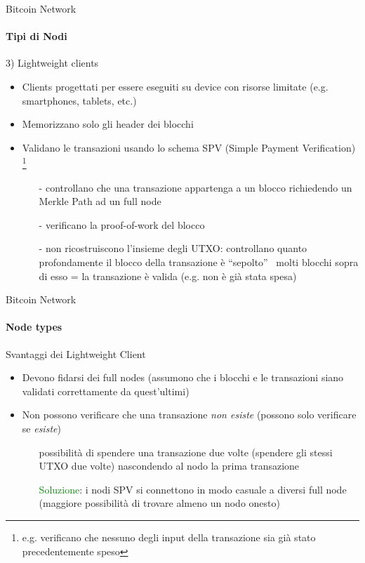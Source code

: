 \documentclass{beamer}
\begin{document}
  
  
  
  \begin{frame}{Bitcoin Network}
    \framesubtitle{Tipi di Nodi}
    \begin{block}{3) Lightweight clients}
        \begin{itemize}
            \item Clients progettati per essere eseguiti su device con risorse limitate (e.g. smartphones, tablets, etc.) 
            \item Memorizzano solo gli header dei blocchi 
            \item Validano le transazioni usando lo schema SPV (Simple Payment Verification) \footnote{e.g. verificano che nessuno degli input della transazione sia già stato precedentemente speso}
            \begin{itemize}
                \item[-] controllano che una transazione appartenga a un blocco richiedendo un Merkle Path ad un full node
                \item[-] verificano la proof-of-work del blocco
                \item[-] non ricostruiscono l'insieme degli UTXO: controllano quanto profondamente il blocco della transazione è ``sepolto'' \MVRightarrow\, molti blocchi sopra di esso = la transazione è valida (e.g. non è già stata spesa)
            \end{itemize}
        \end{itemize}
    \end{block}
  \end{frame}
  
  
  
  
  \begin{frame}{Bitcoin Network}
    \framesubtitle{Node types}
    \begin{block}{Svantaggi dei Lightweight Client}
        \begin{itemize}
            \item Devono fidarsi dei full nodes (assumono che i blocchi e le transazioni siano validati correttamente da quest'ultimi)
            \item Non possono verificare che una transazione \emph{non esiste} (possono solo verificare se \emph{esiste})
            \begin{itemize}
                \item[\MVRightarrow] possibilità di spendere una transazione due volte (spendere gli stessi UTXO due volte) nascondendo al nodo la prima transazione
                \pause
                \item[\MVRightarrow] \textcolor{green}{Soluzione}: i nodi SPV
                si connettono in modo casuale a diversi full node (maggiore possibilità di trovare almeno un nodo onesto) 
            \end{itemize}
        \end{itemize}
    \end{block}
  \end{frame}
  
\end{document}
